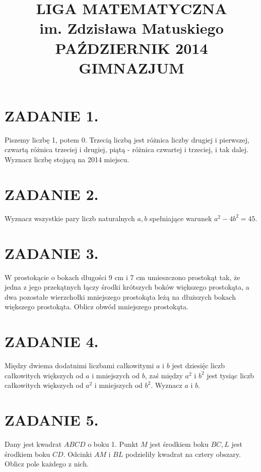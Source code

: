 \documentclass[10pt]{article}
\title{LIGA MATEMATYCZNA \\
 im. Zdzisława Matuskiego \\
 PAŹDZIERNIK 2014 \\
 GIMNAZJUM }
\author{}
\date{}
\begin{document}
\maketitle
\section*{ZADANIE 1.}
Piszemy liczbę 1, potem 0. Trzecią liczbą jest różnica liczby drugiej i pierwszej, czwartą różnica trzeciej i drugiej, piątą - różnica czwartej i trzeciej, i tak dalej. Wyznacz liczbę stojącą na 2014 miejscu.

\section*{ZADANIE 2.}
Wyznacz wszystkie pary liczb naturalnych \(a, b\) spełniające warunek \(a^{2}-4 b^{2}=45\).

\section*{ZADANIE 3.}
W prostokącie o bokach długości 9 cm i 7 cm umieszczono prostokąt tak, że jedna z jego przekątnych łączy środki krótszych boków większego prostokąta, a dwa pozostałe wierzchołki mniejszego prostokąta leżą na dłuższych bokach większego prostokąta. Oblicz obwód mniejszego prostokąta.

\section*{ZADANIE 4.}
Między dwiema dodatnimi liczbami całkowitymi \(a\) i \(b\) jest dziesię́c liczb całkowitych większych od \(a\) i mniejszych od \(b\), zaś między \(a^{2}\) i \(b^{2}\) jest tysiąc liczb całkowitych większych od \(a^{2}\) i mniejszych od \(b^{2}\). Wyznacz \(a\) i \(b\).

\section*{ZADANIE 5.}
Dany jest kwadrat \(A B C D\) o boku 1. Punkt \(M\) jest środkiem boku \(B C, L\) jest środkiem boku \(C D\). Odcinki \(A M\) i \(B L\) podzieliły kwadrat na cztery obszary. Oblicz pole każdego z nich.
\end{document}
